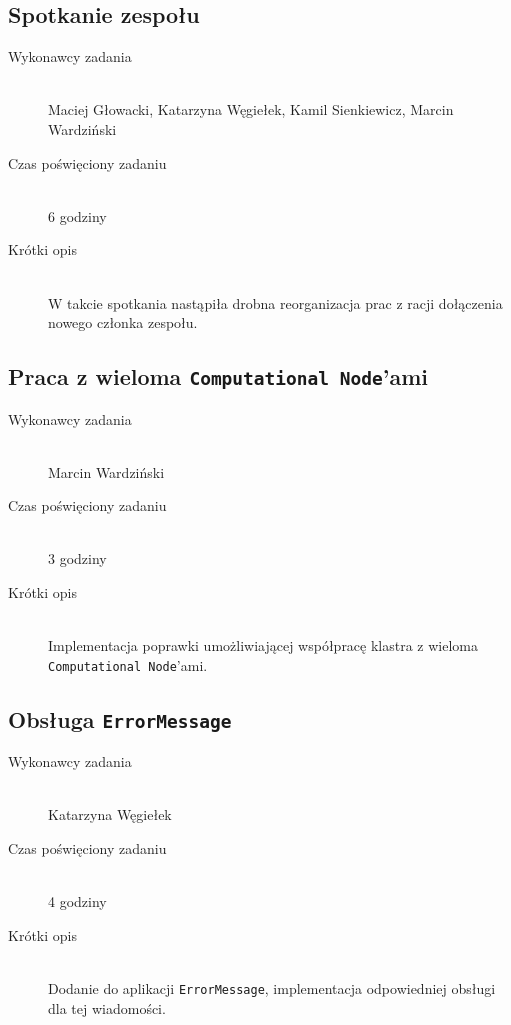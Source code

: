 \documentclass[a4paper]{article}
\begin{document}
\subsection{Spotkanie zespołu}
\begin{description}
    \item[Wykonawcy zadania] \hfill \\ Maciej Głowacki, Katarzyna Węgiełek, Kamil Sienkiewicz, Marcin Wardziński
    \item[Czas poświęciony zadaniu] \hfill \\ 6 godziny
    \item[Krótki opis] \hfill \\ W takcie spotkania nastąpiła drobna reorganizacja prac z racji dołączenia nowego członka zespołu.
\end{description}

\subsection{Praca z wieloma \texttt{Computational Node}'ami}
\begin{description}
    \item[Wykonawcy zadania] \hfill \\ Marcin Wardziński
    \item[Czas poświęciony zadaniu] \hfill \\ 3 godziny
    \item[Krótki opis] \hfill \\ Implementacja poprawki umożliwiającej współpracę klastra z wieloma \texttt{Computational Node}'ami.
\end{description}

\subsection{Obsługa \texttt{ErrorMessage}}
\begin{description}
    \item[Wykonawcy zadania] \hfill \\ Katarzyna Węgiełek
    \item[Czas poświęciony zadaniu] \hfill \\ 4 godziny
    \item[Krótki opis] \hfill \\ Dodanie do aplikacji \texttt{ErrorMessage}, implementacja odpowiedniej obsługi dla tej wiadomości.
\end{description}
   
\end{document}
